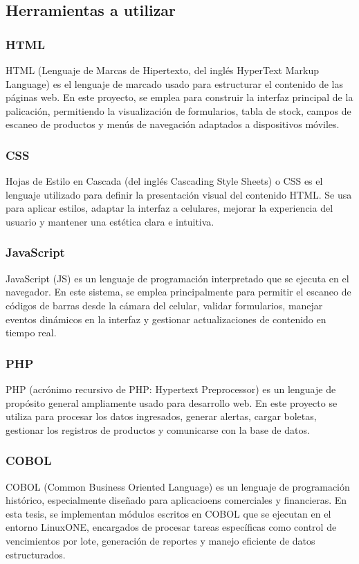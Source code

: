 \documentclass[twoside]{article}
\begin{document}
\subsection{Herramientas a utilizar}
\subsubsection{HTML}
HTML (Lenguaje de Marcas de Hipertexto, del inglés HyperText Markup Language) es el lenguaje de marcado usado para estructurar el contenido de las páginas web. En este proyecto, se emplea para construir la interfaz principal de la palicación, permitiendo la visualización de formularios, tabla de stock, campos de escaneo de productos y menús de navegación adaptados a dispositivos móviles.\cite{mozillaHTMLLenguaje}
\subsubsection{CSS}
Hojas de Estilo en Cascada (del inglés Cascading Style Sheets) o CSS es el lenguaje utilizado para definir la presentación visual del contenido HTML. Se usa para aplicar estilos, adaptar la interfaz a celulares, mejorar la experiencia del usuario y mantener una estética clara e intuitiva.\cite{mozillaCSSCascading}

\subsubsection{JavaScript}
JavaScript (JS) es un lenguaje de programación interpretado que se ejecuta en el navegador. En este sistema, se emplea principalmente para permitir el escaneo de códigos de barras desde la cámara del celular, validar formularios, manejar eventos dinámicos en la interfaz y gestionar actualizaciones de contenido en tiempo real. \cite{mozillaJavaScript}

\subsubsection{PHP}
PHP (acrónimo recursivo de PHP: Hypertext Preprocessor) es un lenguaje de propósito general ampliamente usado para desarrollo web. En este proyecto se utiliza para procesar los datos ingresados, generar alertas, cargar boletas, gestionar los registros de productos y comunicarse con la base de datos. \cite{phpPHPxBFQuxE9}

\subsubsection{COBOL}
COBOL (Common Business Oriented Language) es un lenguaje de programación histórico, especialmente diseñado para aplicacioens comerciales y financieras. En esta tesis, se implementan módulos escritos en COBOL que se ejecutan en el entorno LinuxONE, encargados de procesar tareas específicas como control de vencimientos por lote, generación de reportes y manejo eficiente de datos estructurados. \cite{ibmQuCOBOL}
\end{document}
